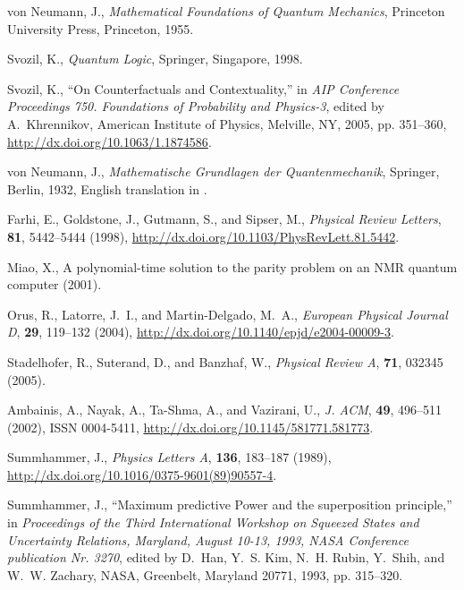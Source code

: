 \begin{thebibliography}{10}
von Neumann, J., \emph{Mathematical Foundations of Quantum Mechanics},
  Princeton University Press, Princeton, 1955.

Svozil, K., \emph{Quantum Logic}, Springer, Singapore, 1998.

Svozil, K., \enquote{On Counterfactuals and Contextuality,} in \emph{AIP
  Conference Proceedings 750. {F}oundations of Probability and Physics-3},
  edited by A.~Khrennikov, American Institute of Physics, Melville, NY, 2005,
  pp. 351--360, \urlprefix\url{http://dx.doi.org/10.1063/1.1874586}.

von Neumann, J., \emph{Mathematische Grundlagen der Quantenmechanik}, Springer,
  Berlin, 1932, {E}nglish translation in \cite{v-neumann-55}.

Farhi, E., Goldstone, J., Gutmann, S., and Sipser, M., \emph{Physical Review
  Letters}, \textbf{81}, 5442--5444 (1998),
  \urlprefix\url{http://dx.doi.org/10.1103/PhysRevLett.81.5442}.

Miao, X., A polynomial-time solution to the parity problem on an {NMR} quantum
  computer (2001).

Orus, R., Latorre, J.~I., and Martin-Delgado, M.~A., \emph{European Physical
  Journal D}, \textbf{29}, 119--132 (2004),
  \urlprefix\url{http://dx.doi.org/10.1140/epjd/e2004-00009-3}.

Stadelhofer, R., Suterand, D., and Banzhaf, W., \emph{Physical Review A},
  \textbf{71}, 032345 (2005).

Ambainis, A., Nayak, A., Ta-Shma, A., and Vazirani, U., \emph{J. ACM},
  \textbf{49}, 496--511 (2002), ISSN 0004-5411,
  \urlprefix\url{http://dx.doi.org/10.1145/581771.581773}.

Summhammer, J., \emph{Physics Letters A}, \textbf{136}, 183--187 (1989),
  \urlprefix\url{http://dx.doi.org/10.1016/0375-9601(89)90557-4}.

Summhammer, J., \enquote{Maximum predictive Power and the superposition
  principle,} in \emph{Proceedings of the Third International Workshop on
  Squeezed States and Uncertainty Relations, Maryland, August 10-13, 1993, NASA
  Conference publication Nr. 3270}, edited by D.~Han, Y.~S. Kim, N.~H. Rubin,
  Y.~Shih, and W.~W. Zachary, NASA, Greenbelt, Maryland 20771, 1993, pp.
  315--320.

\end{thebibliography}




